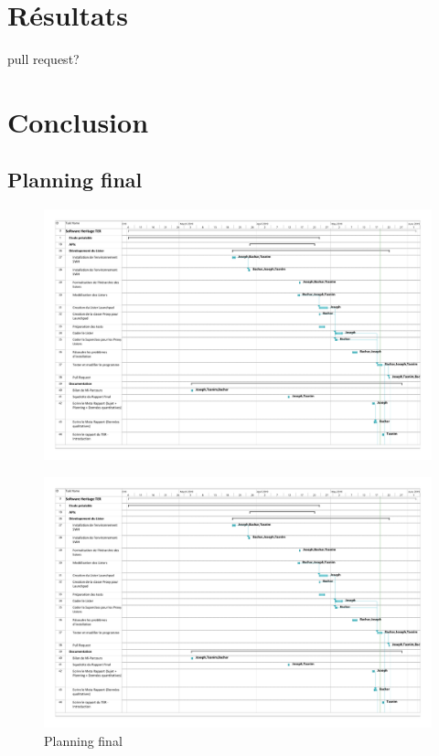\documentclass[12pt,a4paper]{report}
\theoremstyle{definition}
\begin{document}
\chapter{Résultats}
pull request?

\chapter{Conclusion}
	\section{Planning final}
	\begin{figure}[!ht]
	\hspace*{-3cm}
	\includegraphics[scale=0.45]{pdfs/planning_final_summary.pdf}
	\end{figure}
	\begin{figure}[!ht]
	\hspace*{-3cm}
	\includegraphics[scale=0.45,page=2]{pdfs/planning_final_summary.pdf}
	\caption{Planning final}
	\end{figure}
\end{document}
